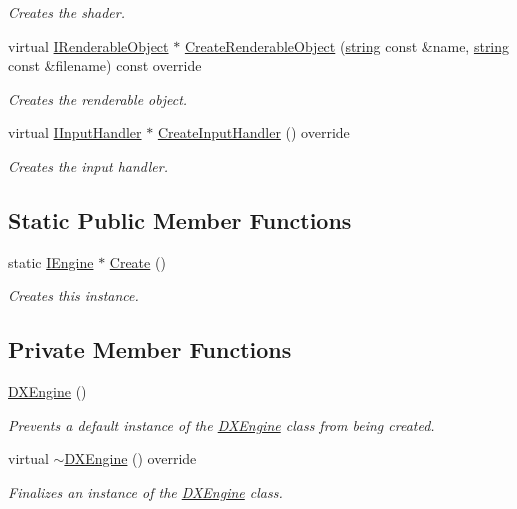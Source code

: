\begin{DoxyCompactItemize}
\begin{DoxyCompactList}\small\item\em Creates the shader. \end{DoxyCompactList}\item 
virtual \hyperlink{class_i_renderable_object}{I\+Renderable\+Object} $\ast$ \hyperlink{class_d_x_engine_ab640a4514292c84b528ee0f197c7deda}{Create\+Renderable\+Object} (\hyperlink{_types_8h_ad453f9f71ce1f9153fb748d6bb25e454}{string} const \&name, \hyperlink{_types_8h_ad453f9f71ce1f9153fb748d6bb25e454}{string} const \&filename) const  override
\begin{DoxyCompactList}\small\item\em Creates the renderable object. \end{DoxyCompactList}\item 
virtual \hyperlink{class_i_input_handler}{I\+Input\+Handler} $\ast$ \hyperlink{class_d_x_engine_ab7158b320580a4df4cf7feebb06f9a6f}{Create\+Input\+Handler} () override
\begin{DoxyCompactList}\small\item\em Creates the input handler. \end{DoxyCompactList}\end{DoxyCompactItemize}
\subsection*{Static Public Member Functions}
\begin{DoxyCompactItemize}
\item 
static \hyperlink{class_i_engine}{I\+Engine} $\ast$ \hyperlink{class_d_x_engine_acdb42db6ccec8c1dfcd7cd24d24202cb}{Create} ()
\begin{DoxyCompactList}\small\item\em Creates this instance. \end{DoxyCompactList}\end{DoxyCompactItemize}
\subsection*{Private Member Functions}
\begin{DoxyCompactItemize}
\item 
\hyperlink{class_d_x_engine_a081ec6a228228bfcc35c127a27c09ad0}{D\+X\+Engine} ()
\begin{DoxyCompactList}\small\item\em Prevents a default instance of the \hyperlink{class_d_x_engine}{D\+X\+Engine} class from being created. \end{DoxyCompactList}\item 
virtual \hyperlink{class_d_x_engine_a8498629b33c7c49ead2b0f62779c7bd8}{$\sim$\+D\+X\+Engine} () override
\begin{DoxyCompactList}\small\item\em Finalizes an instance of the \hyperlink{class_d_x_engine}{D\+X\+Engine} class. \end{DoxyCompactList}\end{DoxyCompactItemize}


